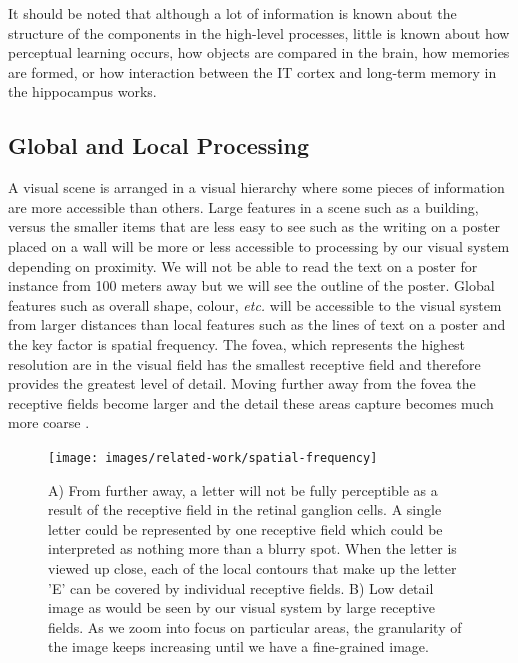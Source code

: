 It should be noted that although a lot of information is known about the structure of the components in the high-level processes, little is known about how perceptual learning occurs, how objects are compared in the brain, how memories are formed, or how interaction between the IT cortex and long-term memory in the hippocampus works.

\subsection{Global and Local Processing}
\label{sec:global_local_processing}

A visual scene is arranged in a visual hierarchy \cite{palmer77, navon77, shor71, love99, kinchla79} where some pieces of information are more accessible than others. 
Large features in a scene such as a building, versus the smaller items that are less easy to see such as the writing on a poster placed on a wall will be more or less accessible to processing by our visual system depending on proximity. 
We will not be able to read the text on a poster for instance from 100 meters away but we will see the outline of the poster.
Global features such as overall shape, colour, \emph{etc.} will be accessible to the visual system from larger distances than local features such as the lines of text on a poster and the key factor is spatial frequency. 
The fovea, which represents the highest resolution are in the visual field has the smallest receptive field and therefore provides the greatest level of detail. Moving further away from the fovea the receptive fields become larger and the detail these areas capture becomes much more coarse \cite{kandel2012principles}.

\begin{figure}[h!]
\centering
\texttt{[image: images/related-work/spatial-frequency]}
\caption{A) From further away, a letter will not be fully perceptible as a result of the receptive field in the retinal ganglion cells. 
A single letter could be represented by one receptive field which could be interpreted as nothing more than a blurry spot. 
When the letter is viewed up close, each of the local contours that make up the letter 'E' can be covered by individual receptive fields. 
B) Low detail image as would be seen by our visual system by large receptive fields. As we zoom into focus on particular areas, the granularity of the image keeps increasing until we have a fine-grained image. }
\label{fig:spatial-frequency}
\end{figure}

